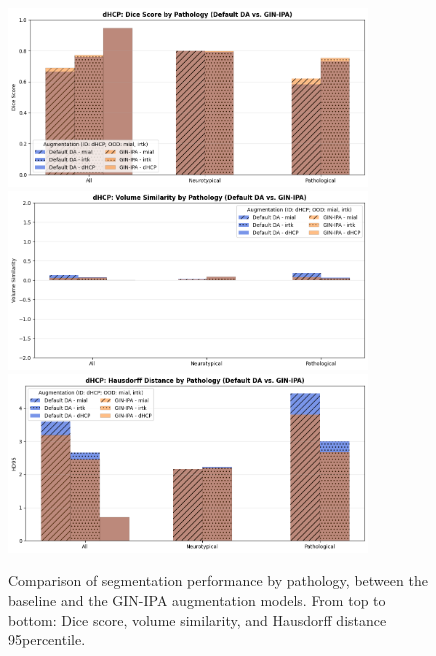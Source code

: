 \begin{figure}[htbp]
  \centering
  \includegraphics[width=0.85\textwidth]{figures/1_pathology_DC.png} \\
  \vspace{10pt}
  \includegraphics[width=0.85\textwidth]{figures/1_pathology_VS.png} \\
  \vspace{10pt}
  \includegraphics[width=0.85\textwidth]{figures/1_pathology_HD.png}
  \caption{Comparison of segmentation performance by pathology, between the baseline and the GIN-IPA augmentation models. From top to bottom: Dice score, volume similarity, and Hausdorff distance 95\th percentile.}
  \label{fig:pathology_summary_1}
\end{figure}

